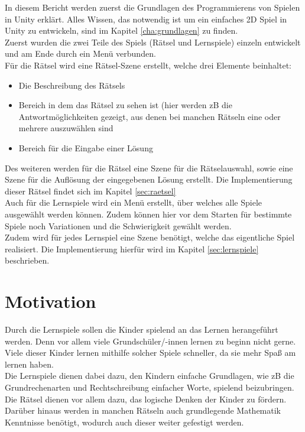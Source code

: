 In diesem Bericht werden zuerst die Grundlagen des Programmierens von Spielen in Unity erklärt. Alles Wissen, das notwendig ist um ein einfaches 2D Spiel in Unity zu entwickeln, sind im Kapitel \ref{cha:grundlagen} zu finden.\\
Zuerst wurden die zwei Teile des Spiels (Rätsel und Lernspiele) einzeln entwickelt und am Ende durch ein Menü verbunden.\\
Für die Rätsel wird eine Rätsel-Szene erstellt, welche drei Elemente beinhaltet:
\begin{itemize}
	\item Die Beschreibung des Rätsels
	\item Bereich in dem das Rätsel zu sehen ist (hier werden zB die Antwortmöglichkeiten gezeigt, aus denen bei manchen Rätseln eine oder mehrere auszuwählen sind %
	\item Bereich für die Eingabe einer Lösung
\end{itemize}
Des weiteren werden für die Rätsel eine Szene für die Rätselauswahl, sowie eine Szene für die Auflösung der eingegebenen Lösung erstellt. Die Implementierung dieser Rätsel findet sich im Kapitel \ref{sec:raetsel}\\

Auch für die Lernspiele wird ein Menü erstellt, über welches alle Spiele ausgewählt werden können. Zudem können hier vor dem Starten für bestimmte Spiele noch Variationen und die Schwierigkeit gewählt werden. \\
Zudem wird für jedes Lernspiel eine Szene benötigt, welche das eigentliche Spiel realisiert. Die Implementierung hierfür wird im Kapitel \ref{sec:lernspiele} beschrieben.\\

\section{Motivation}
\label{sec:motivation}

Durch die Lernspiele sollen die Kinder spielend an das Lernen herangeführt werden. Denn vor allem viele Grundschüler/-innen lernen zu beginn nicht gerne. Viele dieser Kinder lernen mithilfe solcher Spiele schneller, da sie mehr Spaß am lernen haben. \\
Die Lernspiele dienen dabei dazu, den Kindern einfache Grundlagen, wie zB die Grundrechenarten und Rechtschreibung einfacher Worte, spielend beizubringen. Die Rätsel dienen vor allem dazu, das logische Denken der Kinder zu fördern. Darüber hinaus werden in manchen Rätseln auch grundlegende Mathematik Kenntnisse benötigt, wodurch auch dieser weiter gefestigt werden.

